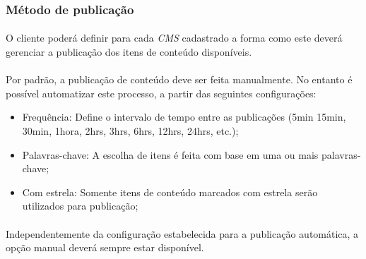 \documentclass[a4paper,12pt]{article}
\def\cms{\emph{CMS}}
\begin{document}
\subsubsection{Método de publicação}

\paragraph{}
O cliente poderá definir para cada \cms{} cadastrado a forma como este deverá
gerenciar a publicação dos itens de conteúdo disponíveis.

\paragraph{}
Por padrão, a publicação de conteúdo deve ser feita manualmente. No entanto é
possível automatizar este processo, a partir das seguintes configurações:

\begin{itemize}


\item Frequência: Define o intervalo de tempo entre as publicações (5min 15min,
30min, 1hora, 2hrs, 3hrs, 6hrs, 12hrs, 24hrs, etc.);
\item Palavras-chave: A escolha de itens é feita com base em uma ou mais
palavras-chave;
\item Com estrela: Somente itens de conteúdo marcados com estrela serão
utilizados para publicação;
\end{itemize}

\paragraph{}
Independentemente da configuração estabelecida para a publicação automática, a
opção manual deverá sempre estar disponível.


\end{document}
